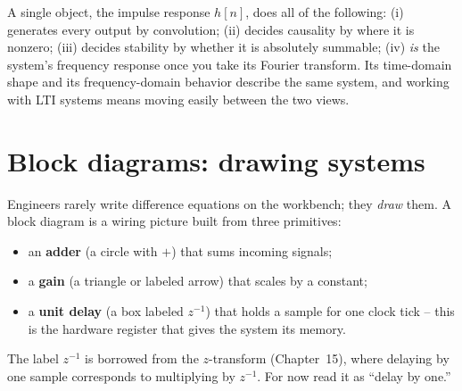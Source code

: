 \begin{aestheticbox}
A single object, the impulse response $h[n]$, does all of the following:
(i) generates every output by convolution;
(ii) decides causality by where it is nonzero;
(iii) decides stability by whether it is absolutely summable;
(iv) \emph{is} the system's frequency response once you take its Fourier
transform. Its time-domain shape and its frequency-domain behavior describe the same
system, and working with LTI systems means moving easily between the two views.
\end{aestheticbox}

\section{Block diagrams: drawing systems}
\label{ch12:block}

Engineers rarely write difference equations on the workbench; they \emph{draw}
them. A block diagram is a wiring picture built from three primitives:
\begin{itemize}
  \item an \textbf{adder} (a circle with $+$) that sums incoming signals;
  \item a \textbf{gain} (a triangle or labeled arrow) that scales by a constant;
  \item a \textbf{unit delay} (a box labeled $z^{-1}$) that holds a sample for
        one clock tick -- this is the hardware register that gives the system its
        memory.
\end{itemize}
The label $z^{-1}$ is borrowed from the $z$-transform (Chapter~15), where
delaying by one sample corresponds to multiplying by $z^{-1}$. For now read it
as ``delay by one.''

